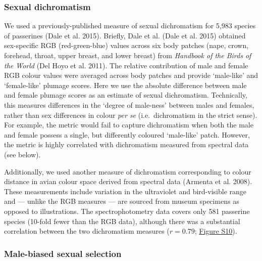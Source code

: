 \documentclass[]{article}
\begin{document}

\hypertarget{sexual-dichromatism}{%
\subsubsection{Sexual dichromatism}\label{sexual-dichromatism}}

We used a previously-published measure of sexual dichromatism for 5,983
species of passerines (Dale et al. 2015). Briefly, Dale et al. (Dale et
al. 2015) obtained sex-specific RGB (red-green-blue) values across six
body patches (nape, crown, forehead, throat, upper breast, and lower
breast) from \emph{Handbook of the Birds of the World} (Del Hoyo et al.
2011). The relative contribution of male and female RGB colour values
were averaged across body patches and provide `male-like' and
`female-like' plumage scores. Here we use the absolute difference
between male and female plumage scores as an estimate of sexual
dichromatism. Technically, this measures differences in the `degree of
male-ness' between males and females, rather than sex differences in
colour \emph{per se} (i.e.~dichromatism in the strict sense). For
example, the metric would fail to capture dichromatism when both the
male and female possess a single, but differently coloured `male-like'
patch. However, the metric is highly correlated with dichromatism
measured from spectral data (see below).

Additionally, we used another measure of dichromatism corresponding to
colour distance in avian colour space derived from spectral data
(Armenta et al. 2008). These measurements include variation in the
ultraviolet and bird-visible range and --- unlike the RGB measures ---
are sourced from museum specimens as opposed to illustrations. The
spectrophotometry data covers only 581 passerine species (10-fold fewer
than the RGB data), although there was a substantial correlation between
the two dichromatism measures (\(r = 0.79\);
\href{https://justincally.github.io/SexualSelection_Speciation/#subsetted_analysis_with_spectrophotometry_data}{Figure S10}).

\hypertarget{male-biased-sexual-selection}{%
\subsubsection{Male-biased sexual
selection}\label{male-biased-sexual-selection}}
\end{document}
